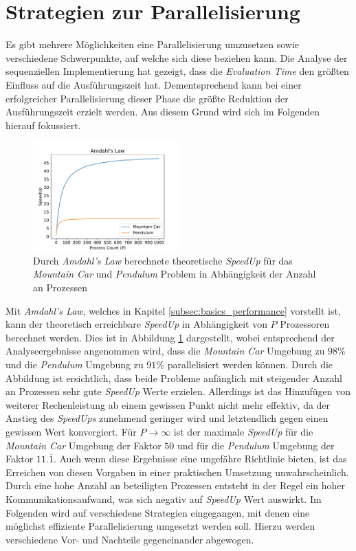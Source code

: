 \section{Strategien zur Parallelisierung}
Es gibt mehrere Möglichkeiten eine Parallelisierung umzusetzen sowie verschiedene Schwerpunkte, auf welche sich diese beziehen kann. Die Analyse der sequenziellen Implementierung hat gezeigt, dass die \emph{Evaluation Time} den größten Einfluss auf die Ausführungszeit hat.  Dementsprechend kann bei einer erfolgreicher Parallelisierung dieser Phase die größte Reduktion der Ausführungszeit erzielt werden. Aus diesem Grund wird sich im Folgenden hierauf fokussiert. 
\begin{figure}[!h]
	\centering
	\includegraphics[width=0.5\textwidth]{./img/ahmdals_law_mountain_pendulum.pdf} 
	\caption{Durch \emph{Amdahl's Law} berechnete theoretische \emph{SpeedUp} für das \emph{Mountain Car} und \emph{Pendulum} Problem in Abhängigkeit der Anzahl an Prozessen}
	\label{fig:amdahls_law_mountain_pendulum}
\end{figure}
Mit \emph{Amdahl's Law}, welches in Kapitel \ref{subsec:basics_performance} vorstellt ist, kann der theoretisch erreichbare \emph{SpeedUp} in Abhängigkeit von $P$ Prozessoren berechnet werden. Dies ist in Abbildung \ref{fig:amdahls_law_mountain_pendulum} dargestellt, wobei entsprechend der Analyseergebnisse angenommen wird, dass die \emph{Mountain Car} Umgebung zu $98\%$ und die \emph{Pendulum} Umgebung zu $91\%$ parallelisiert werden können. Durch die Abbildung ist ersichtlich, dass beide Probleme anfänglich mit steigender Anzahl an Prozessen sehr gute \emph{SpeedUp} Werte erzielen. Allerdings ist das Hinzufügen von weiterer Rechenleistung ab einem gewissen Punkt nicht mehr effektiv, da der Anstieg des \emph{SpeedUps} zunehmend geringer wird und letztendlich gegen einen gewissen Wert konvergiert. Für $P \rightarrow \infty$ ist der maximale \emph{SpeedUp} für die \emph{Mountain Car} Umgebung der Faktor $50$ und für die \emph{Pendulum} Umgebung der Faktor $11.\overline{1}$. Auch wenn diese Ergebnisse eine ungefähre Richtlinie bieten, ist das Erreichen von diesen Vorgaben in einer praktischen Umsetzung unwahrscheinlich. Durch eine hohe Anzahl an beteiligten Prozessen entsteht in der Regel ein hoher Kommunikationsaufwand, was sich negativ auf \emph{SpeedUp} Wert auswirkt. Im Folgenden wird auf verschiedene Strategien eingegangen, mit denen eine möglichst effiziente Parallelisierung umgesetzt werden soll. Hierzu werden verschiedene Vor- und Nachteile gegeneinander abgewogen.
